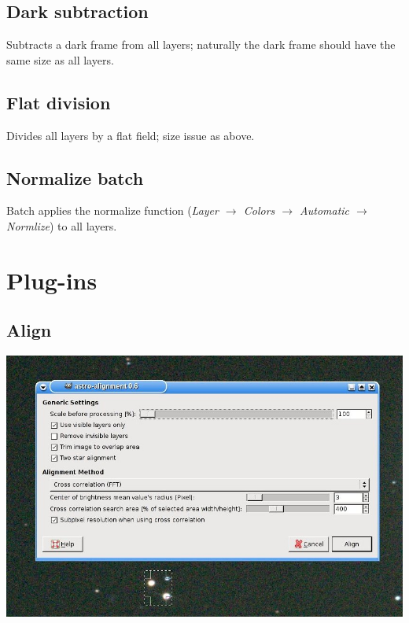 \documentclass[a4paper]{article}
\begin{document}
\subsection{Dark subtraction}

Subtracts a dark frame from all layers; naturally the dark frame should have the same size as all layers.

\subsection{Flat division}

Divides all layers by a flat field; size issue as above.

\subsection{Normalize batch}

Batch applies the normalize function (\emph{Layer $\rightarrow$ Colors $\rightarrow$ Automatic $\rightarrow$ Normlize}) to all layers.

\newpage

\section{Plug-ins}

\subsection{Align}

\begin{center}\includegraphics[width=1.0\textwidth]{align.jpg}\end{center}
\end{document}
